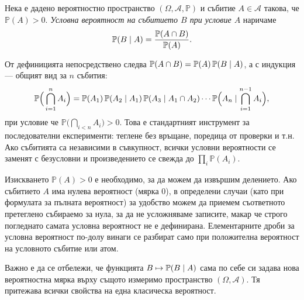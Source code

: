 \begin{keydefn}\label{def:cond3}
Нека е дадено вероятностно пространство $(\Omega, \mathcal{A}, \mathbb{P})$ и събитие $A \in \mathcal{A}$ такова, че $\mathbb{P}(A) > 0$. \emph{Условна вероятност на събитието $B$ при условие $A$} наричаме
\[
\mathbb{P}(B \mid A) = \frac{\mathbb{P}(A \cap B)}{\mathbb{P}(A)} .
\]
\end{keydefn}

\begin{supp}\label{supp:chain-rule}
От дефиницията непосредствено следва $\mathbb{P}(A \cap B) = \mathbb{P}(A)\,\mathbb{P}(B \mid A)$,
а с индукция — общият вид за $n$ събития:
\[
\mathbb{P}\Big( \bigcap_{i=1}^{n} A_i \Big)
 = \mathbb{P}(A_1)\,\mathbb{P}(A_2 \mid A_1)\,\mathbb{P}(A_3 \mid A_1 \cap A_2)
   \cdots \mathbb{P}\Big(A_n \mid \bigcap_{i=1}^{n-1} A_i\Big),
\]
при условие че $\mathbb{P}\big(\bigcap_{i<n} A_i\big) > 0$. Това е стандартният инструмент за
последователни експерименти: теглене без връщане, поредица от проверки и т.н. Ако
събитията са независими в съвкупност, всички условни вероятности се заменят с безусловни и
произведението се свежда до $\prod_i \mathbb{P}(A_i)$.
\end{supp}

Изискването $\mathbb{P}(A) > 0$ е необходимо, за да можем да извършим делението. Ако събитието $A$ има нулева вероятност (мярка $0$), в определени случаи (като при формулата за пълната вероятност) за удобство можем да приемем съответното претеглено събираемо за нула, за да не усложняваме записите, макар че строго погледнато самата условна вероятност не е дефинирана. Елементарните дроби за условна вероятност по-долу винаги се разбират само при положителна вероятност на условното събитие или атом.

Важно е да се отбележи, че функцията $B \mapsto \mathbb{P}(B \mid A)$ сама по себе си задава нова вероятностна мярка върху същото измеримо пространство $(\Omega, \mathcal{A})$. Тя притежава всички свойства на една класическа вероятност.

